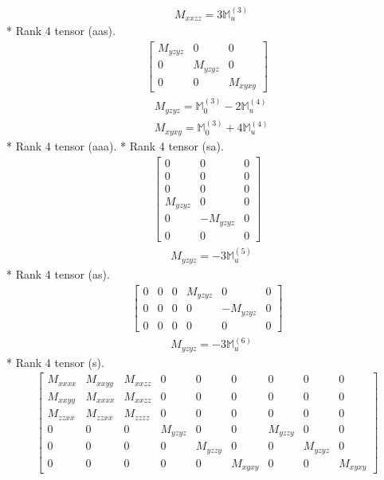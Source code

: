 \documentclass[fleqn,8pt,landscape]{jsarticle}
\begin{document}
\begin{align*}
& M_{xxzz} = 3 \mathbb{M}_{u}^{(3)}
\end{align*}
* Rank 4 tensor (aas).
\begin{align*}
\begin{bmatrix} M_{yzyz} & 0 & 0 \\ 0 & M_{yzyz} & 0 \\ 0 & 0 & M_{xyxy} \end{bmatrix}
\end{align*}
\begin{align*}
& M_{yzyz} = \mathbb{M}_{0}^{(3)} - 2 \mathbb{M}_{u}^{(4)} \\
& M_{xyxy} = \mathbb{M}_{0}^{(3)} + 4 \mathbb{M}_{u}^{(4)}
\end{align*}
* Rank 4 tensor (aaa).
* Rank 4 tensor (sa).
\begin{align*}
\begin{bmatrix} 0 & 0 & 0 \\ 0 & 0 & 0 \\ 0 & 0 & 0 \\ M_{yzyz} & 0 & 0 \\ 0 & - M_{yzyz} & 0 \\ 0 & 0 & 0 \end{bmatrix}
\end{align*}
\begin{align*}
& M_{yzyz} = - 3 \mathbb{M}_{u}^{(5)}
\end{align*}
* Rank 4 tensor (as).
\begin{align*}
\begin{bmatrix} 0 & 0 & 0 & M_{yzyz} & 0 & 0 \\ 0 & 0 & 0 & 0 & - M_{yzyz} & 0 \\ 0 & 0 & 0 & 0 & 0 & 0 \end{bmatrix}
\end{align*}
\begin{align*}
& M_{yzyz} = - 3 \mathbb{M}_{u}^{(6)}
\end{align*}
* Rank 4 tensor (s).
\begin{align*}
\begin{bmatrix} M_{xxxx} & M_{xxyy} & M_{xxzz} & 0 & 0 & 0 & 0 & 0 & 0 \\ M_{xxyy} & M_{xxxx} & M_{xxzz} & 0 & 0 & 0 & 0 & 0 & 0 \\ M_{zzxx} & M_{zzxx} & M_{zzzz} & 0 & 0 & 0 & 0 & 0 & 0 \\ 0 & 0 & 0 & M_{yzyz} & 0 & 0 & M_{yzzy} & 0 & 0 \\ 0 & 0 & 0 & 0 & M_{yzzy} & 0 & 0 & M_{yzyz} & 0 \\ 0 & 0 & 0 & 0 & 0 & M_{xyxy} & 0 & 0 & M_{xyxy} \end{bmatrix}
\end{align*}
\end{document}

